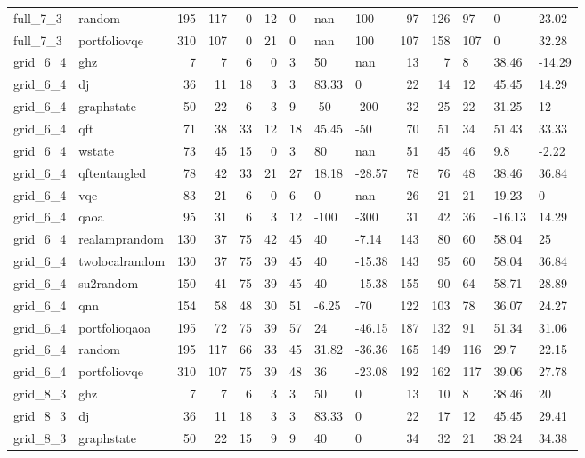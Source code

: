 \begin{longtable}{llrrrrlllrrlll}
full\_7\_3 & random & 195 & 117 & 0 & 12 & 0 & nan & 100 & 97 & 126 & 97 & 0 & 23.02 \\
full\_7\_3 & portfoliovqe & 310 & 107 & 0 & 21 & 0 & nan & 100 & 107 & 158 & 107 & 0 & 32.28 \\
grid\_6\_4 & ghz & 7 & 7 & 6 & 0 & 3 & 50 & nan & 13 & 7 & 8 & 38.46 & -14.29 \\
grid\_6\_4 & dj & 36 & 11 & 18 & 3 & 3 & 83.33 & 0 & 22 & 14 & 12 & 45.45 & 14.29 \\
grid\_6\_4 & graphstate & 50 & 22 & 6 & 3 & 9 & -50 & -200 & 32 & 25 & 22 & 31.25 & 12 \\
grid\_6\_4 & qft & 71 & 38 & 33 & 12 & 18 & 45.45 & -50 & 70 & 51 & 34 & 51.43 & 33.33 \\
grid\_6\_4 & wstate & 73 & 45 & 15 & 0 & 3 & 80 & nan & 51 & 45 & 46 & 9.8 & -2.22 \\
grid\_6\_4 & qftentangled & 78 & 42 & 33 & 21 & 27 & 18.18 & -28.57 & 78 & 76 & 48 & 38.46 & 36.84 \\
grid\_6\_4 & vqe & 83 & 21 & 6 & 0 & 6 & 0 & nan & 26 & 21 & 21 & 19.23 & 0 \\
grid\_6\_4 & qaoa & 95 & 31 & 6 & 3 & 12 & -100 & -300 & 31 & 42 & 36 & -16.13 & 14.29 \\
grid\_6\_4 & realamprandom & 130 & 37 & 75 & 42 & 45 & 40 & -7.14 & 143 & 80 & 60 & 58.04 & 25 \\
grid\_6\_4 & twolocalrandom & 130 & 37 & 75 & 39 & 45 & 40 & -15.38 & 143 & 95 & 60 & 58.04 & 36.84 \\
grid\_6\_4 & su2random & 150 & 41 & 75 & 39 & 45 & 40 & -15.38 & 155 & 90 & 64 & 58.71 & 28.89 \\
grid\_6\_4 & qnn & 154 & 58 & 48 & 30 & 51 & -6.25 & -70 & 122 & 103 & 78 & 36.07 & 24.27 \\
grid\_6\_4 & portfolioqaoa & 195 & 72 & 75 & 39 & 57 & 24 & -46.15 & 187 & 132 & 91 & 51.34 & 31.06 \\
grid\_6\_4 & random & 195 & 117 & 66 & 33 & 45 & 31.82 & -36.36 & 165 & 149 & 116 & 29.7 & 22.15 \\
grid\_6\_4 & portfoliovqe & 310 & 107 & 75 & 39 & 48 & 36 & -23.08 & 192 & 162 & 117 & 39.06 & 27.78 \\
grid\_8\_3 & ghz & 7 & 7 & 6 & 3 & 3 & 50 & 0 & 13 & 10 & 8 & 38.46 & 20 \\
grid\_8\_3 & dj & 36 & 11 & 18 & 3 & 3 & 83.33 & 0 & 22 & 17 & 12 & 45.45 & 29.41 \\
grid\_8\_3 & graphstate & 50 & 22 & 15 & 9 & 9 & 40 & 0 & 34 & 32 & 21 & 38.24 & 34.38 \\

\end{longtable}
